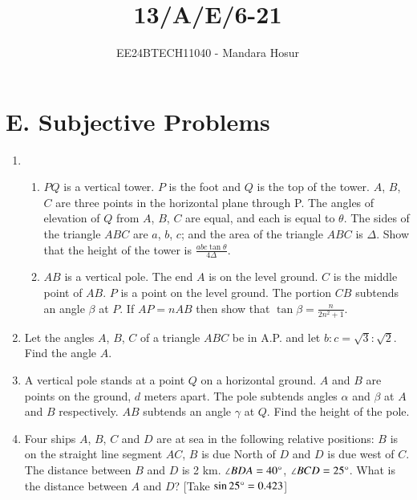 \documentclass[journal,12pt,twocolumn]{IEEEtran}
\theoremstyle{remark}
\begin{document}

\vspace{3cm}

\title{13/A/E/6-21}
\author{EE24BTECH11040 - Mandara Hosur}
\maketitle
\newpage
\bigskip

\renewcommand{\thefigure}{\theenumi}
\renewcommand{\thetable}{\theenumi}

\section*{\textbf{E. Subjective Problems}}

\begin{enumerate}

\item 
\begin{enumerate}
\item $PQ$ is a vertical tower. $P$ is the foot and $Q$ is the top of the tower. $A$, $B$, $C$ are three points in the horizontal plane through P. The angles of elevation of $Q$ from $A$, $B$, $C$ are equal, and each is equal to $\theta$. The sides of the triangle $ABC$ are $a$, $b$, $c$; and the area of the triangle $ABC$ is $\Delta$. Show that the height of the tower is $\frac{abc\tan{\theta}}{4\Delta}$.
\item $AB$ is a vertical pole. The end $A$ is on the level ground. $C$ is the middle point of $AB$. $P$ is a point on the level ground. The portion $CB$ subtends an angle $\beta$ at $P$. If $AP=nAB$ then show that $\tan{\beta}=\frac{n}{2n^2+1}$.
\end{enumerate}

\hfill{}

\item Let the angles $A$, $B$, $C$ of a triangle $ABC$ be in A.P. and let $b:c=\sqrt{3}:\sqrt{2}$. Find the angle $A$. 

\hfill{}

\item A vertical pole stands at a point $Q$ on a horizontal ground. $A$ and $B$ are points on the ground, $d$ meters apart. The pole subtends angles $\alpha$ and $\beta$ at $A$ and $B$ respectively. $AB$ subtends an angle $\gamma$ at $Q$. Find the height of the pole. 

\hfill{}

\item Four ships $A$, $B$, $C$ and $D$ are at sea in the following relative positions: $B$ is on the straight line segment $AC$, $B$ is due North of $D$ and $D$ is due west of $C$. The distance between $B$ and $D$ is 2 km. $\angle{BDA}=40\degree$, $\angle{BCD}=25\degree$. What is the distance between $A$ and $D$? [Take $\sin{25\degree}=0.423$]


\end{enumerate}
\end{document}
